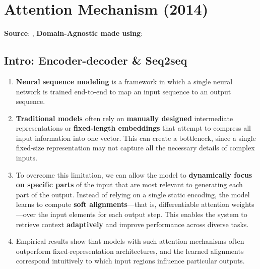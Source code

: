 \chapter{Attention Mechanism (2014)}

\begin{center}
    \textbf{Source}: \cite{arxiv/1409.0473/NMT-Jointly-Learning-Align-Translate},
    \textbf{Domain-Agnostic made using}: \cite{common/online/chatgpt}
\end{center}



\section{Intro: Encoder-decoder \& Seq2seq}

\begin{enumerate}
    \item \textbf{Neural sequence modeling} is a framework in which a single neural network is trained end-to-end to map an input sequence to an output sequence. 
    \hfill \cite{arxiv/1409.0473/NMT-Jointly-Learning-Align-Translate, common/online/chatgpt}

    \item \textbf{Traditional models} often rely on \textbf{manually designed} intermediate representations or \textbf{fixed-length embeddings} that attempt to compress all input information into one vector. 
    This can create a bottleneck, since a single fixed-size representation may not capture all the necessary details of complex inputs. 
    \hfill \cite{arxiv/1409.0473/NMT-Jointly-Learning-Align-Translate, common/online/chatgpt}

    \item To overcome this limitation, we can allow the model to \textbf{dynamically focus on specific parts} of the input that are most relevant to generating each part of the output. 
    Instead of relying on a single static encoding, the model learns to compute \textbf{soft alignments}—that is, differentiable attention weights—over the input elements for each output step. 
    This enables the system to retrieve context \textbf{adaptively} and improve performance across diverse tasks.
    \hfill \cite{arxiv/1409.0473/NMT-Jointly-Learning-Align-Translate, common/online/chatgpt}

    \item Empirical results show that models with such attention mechanisms often outperform fixed-representation architectures, and the learned alignments correspond intuitively to which input regions influence particular outputs.
    \hfill \cite{arxiv/1409.0473/NMT-Jointly-Learning-Align-Translate, common/online/chatgpt}


\end{enumerate}
